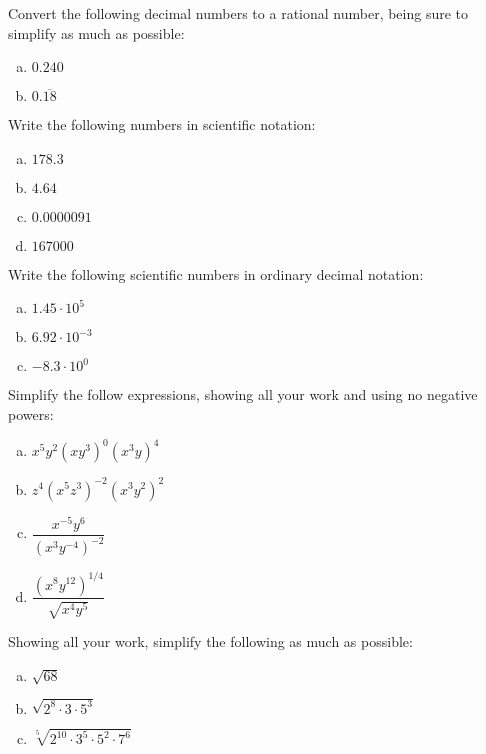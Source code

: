 \documentclass[12pt,letterpaper]{exam}
\begin{document}
\begin{questions}
\newpage
\question[10] Convert the following decimal numbers to a rational number, being sure to simplify as much as possible:
	\begin{enumerate}[(a)]
	\item $0.240$
	\item $0.\overline{18}$
	\end{enumerate}



\newpage
\question[10] Write the following numbers in scientific notation:
	\begin{enumerate}[(a)]
	\item $178.3$
	\item $4.64$
	\item $0.0000091$
	\item $167000$
	\end{enumerate}



\newpage
\question[10] Write the following scientific numbers in ordinary decimal notation:
	\begin{enumerate}[(a)]
	\item $1.45 \cdot 10^5$ 
	\item $6.92 \cdot 10^{-3}$
	\item $-8.3 \cdot 10^0$
	\end{enumerate}



\newpage
\question[10] Simplify the follow expressions, showing all your work and using no negative powers:
	\begin{enumerate}[(a)] \itemsep=0.3cm
	\item $x^5 y^2 (xy^3)^0 (x^3y)^4$
	\item $z^4(x^5 z^3)^{-2} (x^3 y^2)^2$
	\item $\dfrac{x^{-5} y^6}{(x^3 y^{-4})^{-2}}$
	\item $\dfrac{(x^8 y^{12})^{1/4}}{\sqrt{x^4 y^5}}$
	\end{enumerate}



\newpage
\question[10] Showing all your work, simplify the following as much as possible:
	\begin{enumerate}[(a)]
	\item $\sqrt{68}$
	\item $\sqrt{2^8 \cdot 3 \cdot 5^3}$
	\item $\sqrt[5]{2^{10} \cdot 3^5 \cdot 5^2 \cdot 7^6}$
	\end{enumerate}




\end{questions}
\end{document}
